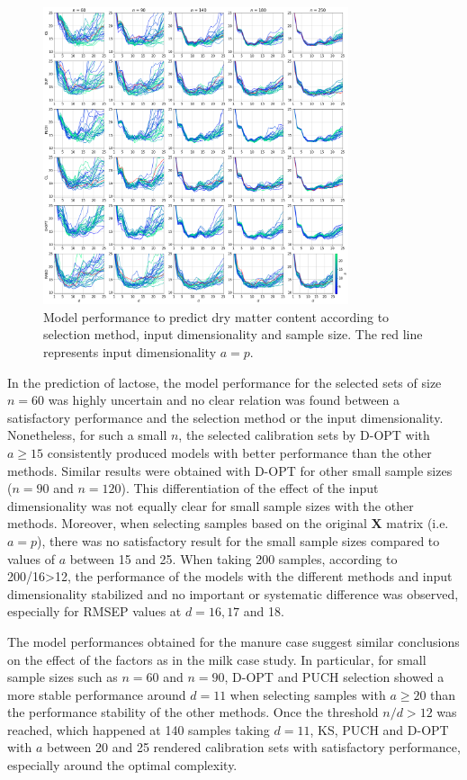 \documentclass[preprint,12pt]{elsarticle}
\begin{document}
\begin{figure}[H]
\includegraphics[width=0.8\textwidth]{manuscript/figures/d02_manure_model_performance.png}
\centering
\caption{Model performance to predict dry matter content according to selection method, input dimensionality and sample size. The red line represents input dimensionality $a=p$.}
\label{fig_d02_manure_model_performance}
\end{figure}


In the prediction of lactose, the model performance for the selected sets of size $n=60$ was highly uncertain and no clear relation was found between a satisfactory performance and the selection method or the input dimensionality. Nonetheless, for such a small $n$, the selected calibration sets by D-OPT with $a \ge 15$ consistently produced models with better performance than the other methods. Similar results were obtained with D-OPT for other small sample sizes ($n=90$ and $n=120$). This differentiation of the effect of the input dimensionality was not equally clear for small sample sizes with the other methods. Moreover, when selecting samples based on the original $\mathbf{X}$ matrix (i.e. $a=p$), there was no satisfactory result for the small sample sizes compared to values of $a$ between 15 and 25. When taking 200 samples, according to 200/16>12, the performance of the models with the different methods and input dimensionality stabilized and no important or systematic difference was observed, especially for RMSEP values at $d=16, 17$ and 18.

The model performances obtained for the manure case suggest similar conclusions on the effect of the factors as in the milk case study. In particular, for small sample sizes such as $n=60$ and $n=90$, D-OPT and PUCH selection showed a more stable performance around $d = 11$ when selecting samples with $a \ge 20$ than the performance stability of the other methods. Once the threshold $n/d>12$ was reached, which happened at 140 samples taking $d=11$, KS, PUCH and D-OPT with $a$ between 20 and 25 rendered calibration sets with satisfactory performance, especially around the optimal complexity. 
\end{document}
